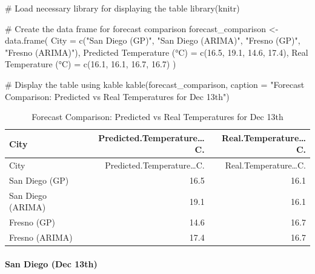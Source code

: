 \documentclass[
  11pt,
]{article}
\makeatletter
\let\oldparagraph\paragraph
\renewcommand{\paragraph}{
    \@ifstar
      \xxxParagraphStar
      \xxxParagraphNoStar
  }
\newcommand{\xxxParagraphStar}[1]{\oldparagraph*{#1}\mbox{}}
\newcommand{\xxxParagraphNoStar}[1]{\oldparagraph{#1}\mbox{}}
\newenvironment{Shaded}{\begin{snugshade}}{\end{snugshade}}
\newcommand{\AttributeTok}[1]{\textcolor[rgb]{0.40,0.45,0.13}{#1}}
\newcommand{\CommentTok}[1]{\textcolor[rgb]{0.37,0.37,0.37}{#1}}
\newcommand{\FloatTok}[1]{\textcolor[rgb]{0.68,0.00,0.00}{#1}}
\newcommand{\FunctionTok}[1]{\textcolor[rgb]{0.28,0.35,0.67}{#1}}
\newcommand{\NormalTok}[1]{\textcolor[rgb]{0.00,0.23,0.31}{#1}}
\newcommand{\OtherTok}[1]{\textcolor[rgb]{0.00,0.23,0.31}{#1}}
\newcommand{\StringTok}[1]{\textcolor[rgb]{0.13,0.47,0.30}{#1}}
\makeatother
\begin{document}
\begin{Shaded}
\begin{Highlighting}[]
\CommentTok{\# Load necessary library for displaying the table}
\FunctionTok{library}\NormalTok{(knitr)}

\CommentTok{\# Create the data frame for forecast comparison}
\NormalTok{forecast\_comparison }\OtherTok{\textless{}{-}} \FunctionTok{data.frame}\NormalTok{(}
  \AttributeTok{City =} \FunctionTok{c}\NormalTok{(}\StringTok{"San Diego (GP)"}\NormalTok{, }\StringTok{"San Diego (ARIMA)"}\NormalTok{, }\StringTok{"Fresno (GP)"}\NormalTok{, }\StringTok{"Fresno (ARIMA)"}\NormalTok{),}
  \StringTok{\textasciigrave{}}\AttributeTok{Predicted Temperature (°C)}\StringTok{\textasciigrave{}} \OtherTok{=} \FunctionTok{c}\NormalTok{(}\FloatTok{16.5}\NormalTok{, }\FloatTok{19.1}\NormalTok{, }\FloatTok{14.6}\NormalTok{, }\FloatTok{17.4}\NormalTok{),}
  \StringTok{\textasciigrave{}}\AttributeTok{Real Temperature (°C)}\StringTok{\textasciigrave{}} \OtherTok{=} \FunctionTok{c}\NormalTok{(}\FloatTok{16.1}\NormalTok{, }\FloatTok{16.1}\NormalTok{, }\FloatTok{16.7}\NormalTok{, }\FloatTok{16.7}\NormalTok{)}
\NormalTok{)}

\CommentTok{\# Display the table using kable}
\FunctionTok{kable}\NormalTok{(forecast\_comparison, }\AttributeTok{caption =} \StringTok{"Forecast Comparison: Predicted vs Real Temperatures for Dec 13th"}\NormalTok{)}
\end{Highlighting}
\end{Shaded}

\begin{longtable}[]{@{}lrr@{}}
\caption{Forecast Comparison: Predicted vs Real Temperatures for Dec
13th}\tabularnewline
\toprule\noalign{}
City & Predicted.Temperature\ldots C. & Real.Temperature\ldots C. \\
\midrule\noalign{}
\endfirsthead
\toprule\noalign{}
City & Predicted.Temperature\ldots C. & Real.Temperature\ldots C. \\
\midrule\noalign{}
\endhead
\bottomrule\noalign{}
\endlastfoot
San Diego (GP) & 16.5 & 16.1 \\
San Diego (ARIMA) & 19.1 & 16.1 \\
Fresno (GP) & 14.6 & 16.7 \\
Fresno (ARIMA) & 17.4 & 16.7 \\
\end{longtable}

\paragraph{\texorpdfstring{\textbf{San Diego (Dec
13th)}}{San Diego (Dec 13th)}}\label{san-diego-dec-13th}
\end{document}
